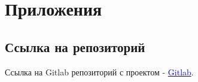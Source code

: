 \section{Приложения}

\subsection{Ссылка на репозиторий}

Ссылка на Gitlab репозиторий с проектом - \href{https://gitlab.com/Ch0p1k3/papams-nft-discord-bot}{\textcolor{blue}{Gitlab}}.
